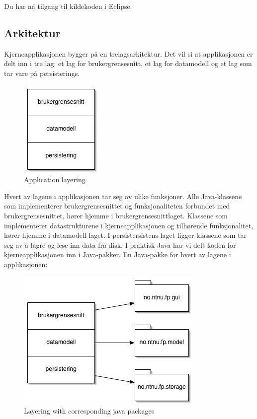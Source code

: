\documentclass[a4paper]{scrartcl}
\begin{document}
Du har nå tilgang til kildekoden i Eclipse.

\subsection{Arkitektur}

Kjerneapplikasjonen bygger på en trelagsarkitektur. Det vil si at applikasjonen er delt inn i tre lag: et lag for brukergrensesnitt, et lag for datamodell og et lag som tar vare på persisterings.

\begin{figure}[H]
    \centering
    \includegraphics{resources/layering-application.jpg}
    \caption{Application layering}
    \label{fig:layering-application}
\end{figure}

Hvert av lagene i applikasjonen tar seg av ulike funksjoner. Alle Java-klassene som implementerer brukergrensesnittet og funksjonaliteten forbundet med brukergrensesnittet, hører hjemme i brukergrensesnittlaget. Klassene som implementerer datastrukturene i kjerneapplikasjonen og tilhørende funksjonalitet, hører hjemme i datamodell-laget. I persistersistens-laget ligger klassene som tar seg av å lagre og lese inn data fra disk. I praktisk Java har vi delt koden for kjerneapplikasjonen inn i Java-pakker. En Java-pakke for hvert av lagene i applikasjonen:

\begin{figure}[H]
    \centering
    \includegraphics[width=\textwidth]{resources/layering-corresponding-java-packets.jpg}
    \caption{Layering with corresponding java packages}
    \label{fig:layering-corresponding-java-packets}
\end{figure}
\end{document}
